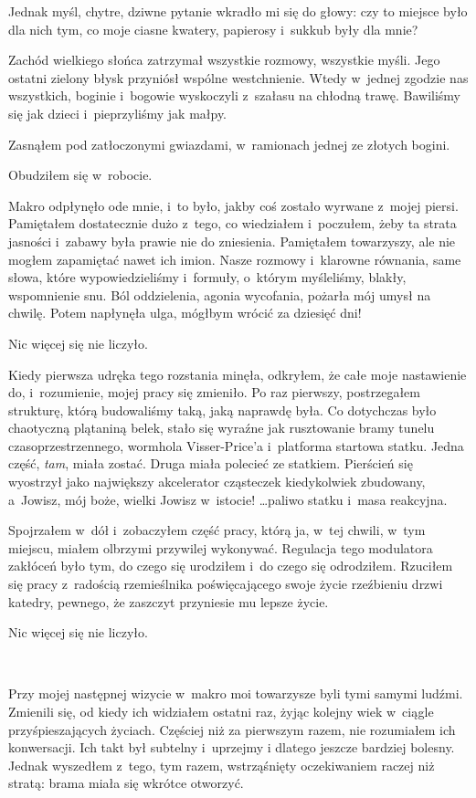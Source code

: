 \documentclass[oneside,polish,11pt,sfheadings]{mwbk}
\begin{document}
Jednak myśl, chytre, dziwne pytanie wkradło mi się do głowy: czy to
miejsce było dla nich tym, co moje ciasne kwatery, papierosy i~sukkub
były dla mnie?

Zachód wielkiego słońca zatrzymał wszystkie rozmowy, wszystkie myśli.
Jego ostatni zielony błysk przyniósł wspólne westchnienie. Wtedy w~jednej zgodzie nas wszystkich, boginie i~bogowie wyskoczyli z~szałasu na
chłodną trawę. Bawiliśmy się jak dzieci i~pieprzyliśmy jak małpy.

Zasnąłem pod zatłoczonymi gwiazdami, w~ramionach jednej ze złotych
bogini.

Obudziłem się w~robocie.

Makro odpłynęło ode mnie, i~to było, jakby coś zostało wyrwane z~mojej
piersi. Pamiętałem dostatecznie dużo z~tego, co wiedziałem i~poczułem,
żeby ta strata jasności i~zabawy była prawie nie do zniesienia.
Pamiętałem towarzyszy, ale nie mogłem zapamiętać nawet ich imion. Nasze
rozmowy i~klarowne równania, same słowa, które wypowiedzieliśmy i~formuły, o~którym myśleliśmy, blakły, wspomnienie snu. Ból oddzielenia,
agonia wycofania, pożarła mój umysł na chwilę. Potem napłynęła ulga,
mógłbym wrócić za dziesięć dni!

Nic więcej się nie liczyło.

Kiedy pierwsza udręka tego rozstania minęła, odkryłem, że całe moje
nastawienie do, i~rozumienie, mojej pracy się zmieniło. Po raz pierwszy,
postrzegałem strukturę, którą budowaliśmy taką, jaką naprawdę była. Co
dotychczas było chaotyczną plątaniną belek, stało się wyraźne jak
rusztowanie bramy tunelu czasoprzestrzennego, wormhola Visser-Price'a i~platforma startowa statku. Jedna część, \emph{tam},
miała zostać. Druga miała polecieć ze statkiem. Pierścień się wyostrzył
jako największy akcelerator cząsteczek kiedykolwiek zbudowany, a~Jowisz,
mój boże, wielki Jowisz w~istocie! \ldots paliwo statku i~masa reakcyjna.

Spojrzałem w~dół i~zobaczyłem część pracy, którą ja, w~tej chwili, w~tym
miejscu, miałem olbrzymi przywilej wykonywać. Regulacja tego modulatora
zakłóceń było tym, do czego się urodziłem i~do czego się odrodziłem.
Rzuciłem się pracy z~radością rzemieślnika poświęcającego swoje życie
rzeźbieniu drzwi katedry, pewnego, że zaszczyt przyniesie mu lepsze
życie.

Nic więcej się nie liczyło.

~

Przy mojej następnej wizycie w~makro moi towarzysze byli tymi samymi
ludźmi. Zmienili się, od kiedy ich widziałem ostatni raz, żyjąc kolejny
wiek w~ciągle przyśpieszających życiach. Częściej niż za pierwszym
razem, nie rozumiałem ich konwersacji. Ich takt był subtelny i~uprzejmy
i dlatego jeszcze bardziej bolesny. Jednak wyszedłem z~tego, tym razem,
wstrząśnięty oczekiwaniem raczej niż stratą: brama miała się wkrótce
otworzyć.
\end{document}
